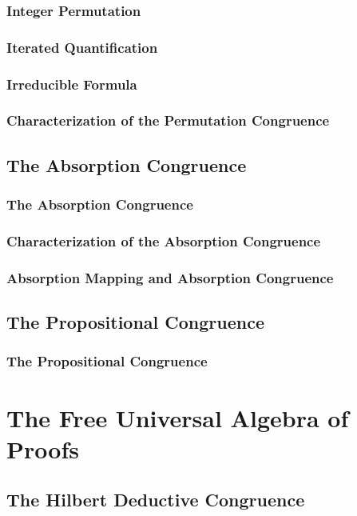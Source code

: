 \documentclass{report}
\begin{document}
    \subsection{Integer Permutation}
      
    \subsection{Iterated Quantification}
      
    \subsection{Irreducible Formula}
      
    \subsection{Characterization of the Permutation Congruence}
      
\section{The Absorption Congruence}
    \subsection{The Absorption Congruence}
      
    \subsection{Characterization of the Absorption Congruence}
      
    \subsection{Absorption Mapping and Absorption Congruence}
      
\section{The Propositional Congruence}
    \subsection{The Propositional Congruence}
      
\chapter{The Free Universal Algebra of Proofs}
\section{The Hilbert Deductive Congruence}
\end{document}
